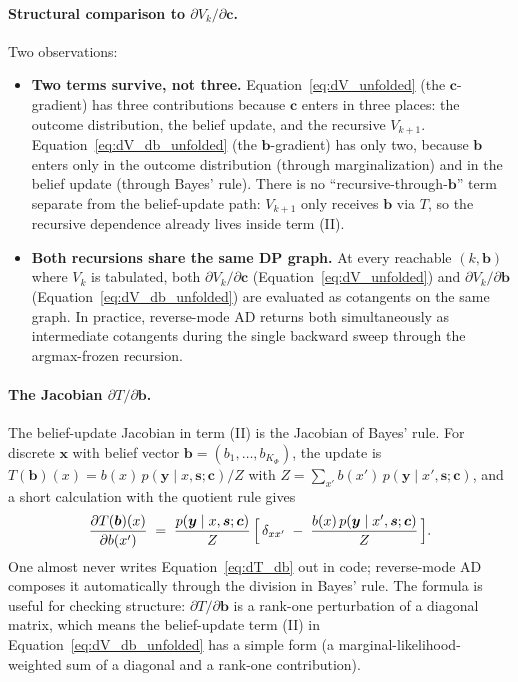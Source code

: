 \documentclass[11pt]{article}
\newcommand{\bc}{\bm{c}}
\newcommand{\bx}{\bm{x}}
\newcommand{\by}{\bm{y}}
\newcommand{\bs}{\bm{s}}
\newcommand{\bb}{\bm{b}}
\begin{document}
\paragraph{Structural comparison to $\partial V_k / \partial \bc$.}  Two observations:
\begin{itemize}[nosep, leftmargin=*]
\item \textbf{Two terms survive, not three.}  Equation~\eqref{eq:dV_unfolded} (the $\bc$-gradient) has three contributions because $\bc$ enters in three places: the outcome distribution, the belief update, and the recursive $V_{k+1}$.  Equation~\eqref{eq:dV_db_unfolded} (the $\bb$-gradient) has only two, because $\bb$ enters only in the outcome distribution (through marginalization) and in the belief update (through Bayes' rule).  There is no ``recursive-through-$\bb$'' term separate from the belief-update path: $V_{k+1}$ only receives $\bb$ via $T$, so the recursive dependence already lives inside term (II).
\item \textbf{Both recursions share the same DP graph.}  At every reachable $(k, \bb)$ where $V_k$ is tabulated, both $\partial V_k / \partial \bc$ (Equation~\eqref{eq:dV_unfolded}) and $\partial V_k / \partial \bb$ (Equation~\eqref{eq:dV_db_unfolded}) are evaluated as cotangents on the same graph.  In practice, reverse-mode AD returns both simultaneously as intermediate cotangents during the single backward sweep through the argmax-frozen recursion.
\end{itemize}

\paragraph{The Jacobian $\partial T / \partial \bb$.}  The belief-update Jacobian in term (II) is the Jacobian of Bayes' rule.  For discrete $\bx$ with belief vector $\bb = (b_1, \ldots, b_{K_\Phi})$, the update is $T(\bb)(x) = b(x)\, p(\by \mid x, \bs; \bc) / Z$ with $Z = \sum_{x'} b(x')\, p(\by \mid x', \bs; \bc)$, and a short calculation with the quotient rule gives
\begin{equation}
\frac{\partial T(\bb)(x)}{\partial b(x')} \;=\; \frac{p(\by \mid x, \bs; \bc)}{Z}\, \Bigl[\,\delta_{xx'} \;-\; \frac{b(x)\, p(\by \mid x', \bs; \bc)}{Z}\,\Bigr].
\label{eq:dT_db}
\end{equation}
One almost never writes Equation~\eqref{eq:dT_db} out in code; reverse-mode AD composes it automatically through the division in Bayes' rule.  The formula is useful for checking structure: $\partial T / \partial \bb$ is a rank-one perturbation of a diagonal matrix, which means the belief-update term (II) in Equation~\eqref{eq:dV_db_unfolded} has a simple form (a marginal-likelihood-weighted sum of a diagonal and a rank-one contribution).
\end{document}
